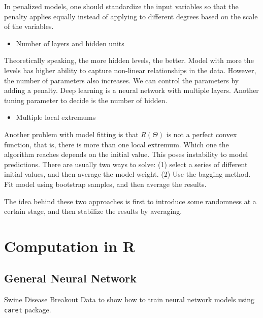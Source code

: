 \documentclass[]{book}
\newenvironment{Shaded}{\begin{snugshade}}{\end{snugshade}}
\newcommand{\KeywordTok}[1]{\textcolor[rgb]{0.13,0.29,0.53}{\textbf{{#1}}}}
\newcommand{\StringTok}[1]{\textcolor[rgb]{0.31,0.60,0.02}{{#1}}}
\newcommand{\CommentTok}[1]{\textcolor[rgb]{0.56,0.35,0.01}{\textit{{#1}}}}
\newcommand{\NormalTok}[1]{{#1}}
\providecommand{\tightlist}{%
  \setlength{\itemsep}{0pt}\setlength{\parskip}{0pt}}
\theoremstyle{definition}
\theoremstyle{definition}
\theoremstyle{remark}
\begin{document}
In penalized models, one should standardize the input variables so that
the penalty applies equally instead of applying to different degrees
based on the scale of the variables.

\begin{itemize}
\tightlist
\item
  Number of layers and hidden units
\end{itemize}

Theoretically speaking, the more hidden levels, the better. Model with
more the levels has higher ability to capture non-linear relationships
in the data. However, the number of parameters also increases. We can
control the parameters by adding a penalty. Deep learning is a neural
network with multiple layers. Another tuning parameter to decide is the
number of hidden.

\begin{itemize}
\tightlist
\item
  Multiple local extremums
\end{itemize}

Another problem with model fitting is that \(R(\Theta)\) is not a
perfect convex function, that is, there is more than one local extremum.
Which one the algorithm reaches depends on the initial value. This poses
instability to model predictions. There are usually two ways to solve:
(1) select a series of different initial values, and then average the
model weight. (2) Use the bagging method. Fit model using bootstrap
samples, and then average the results.

The idea behind these two approaches is first to introduce some
randomness at a certain stage, and then stabilize the results by
averaging.

\section{Computation in R}\label{computation-in-r}

\subsection{General Neural Network}\label{general-neural-network}

Swine Disease Breakout Data to show how to train neural network models
using \texttt{caret} package.

\begin{Shaded}
\end{Shaded}
\end{document}
